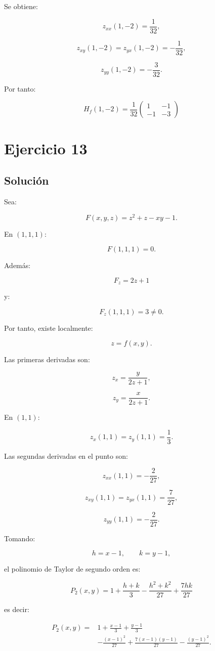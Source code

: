 \documentclass[11pt,a4paper]{article}
\begin{document}
Se obtiene:

\[
z_{xx}(1,-2)=\frac1{32},
\]

\[
z_{xy}(1,-2)=z_{yx}(1,-2)=-\frac1{32},
\]

\[
z_{yy}(1,-2)=-\frac3{32}.
\]

Por tanto:

\[
\boxed{
H_f(1,-2)
=
\frac1{32}
\begin{pmatrix}
1&-1\\
-1&-3
\end{pmatrix}
}
\]

\section{Ejercicio 13}
\subsection{Solución}

Sea:

\[
F(x,y,z)
=
z^2+z-xy-1.
\]

En \((1,1,1)\):

\[
F(1,1,1)=0.
\]

Además:

\[
F_z=2z+1
\]

y:

\[
F_z(1,1,1)=3\neq0.
\]

Por tanto, existe localmente:

\[
z=f(x,y).
\]

Las primeras derivadas son:

\[
z_x
=
\frac{y}{2z+1},
\]

\[
z_y
=
\frac{x}{2z+1}.
\]

En \((1,1)\):

\[
z_x(1,1)=z_y(1,1)=\frac13.
\]

Las segundas derivadas en el punto son:

\[
z_{xx}(1,1)
=
-\frac2{27},
\]

\[
z_{xy}(1,1)
=
z_{yx}(1,1)
=
\frac7{27},
\]

\[
z_{yy}(1,1)
=
-\frac2{27}.
\]

Tomando:

\[
h=x-1,
\qquad
k=y-1,
\]

el polinomio de Taylor de segundo orden es:

\[
\boxed{
P_2(x,y)
=
1
+
\frac{h+k}{3}
-
\frac{h^2+k^2}{27}
+
\frac{7hk}{27}
}
\]

es decir:

\[
\boxed{
\begin{aligned}
P_2(x,y)
={}&
1
+
\frac{x-1}{3}
+
\frac{y-1}{3}\\
&-
\frac{(x-1)^2}{27}
+
\frac{7(x-1)(y-1)}{27}
-
\frac{(y-1)^2}{27}.
\end{aligned}
}
\]
\end{document}
